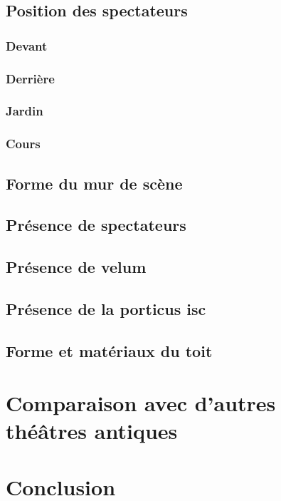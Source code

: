 		\section{Position des spectateurs}
			\subsection{Devant}
			\subsection{Derrière}
			\subsection{Jardin}
			\subsection{Cours}
		\section{Forme du mur de scène}	
		\section{Présence de spectateurs}
		\section{Présence de velum}
		\section{Présence de la \gls{porticus isc}}
		\section{Forme et matériaux du toit}
		
		\newpage

	\chapter{Comparaison avec d'autres théâtres antiques}
		\minitoc
		\newpage
	
	\chapter*{Conclusion}
	
		\newpage
		
 
 
